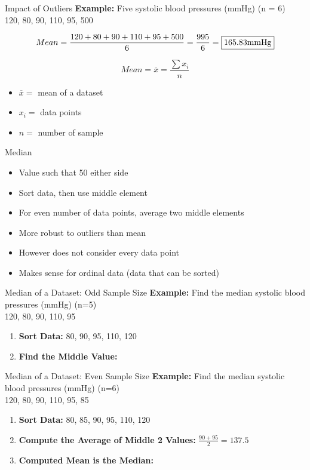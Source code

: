 \begin{frame}[t]{Impact of Outliers}
	\textbf{Example:} Five systolic blood pressures (mmHg) (n = 6) \\ 
	120, 80, 90, 110, 95, 500
	
	$$
	Mean = 
	\frac{120+80+90+110+95+500}{6}
	= \frac{995}{6}
	= \fbox{165.83mmHg}
	$$
	
	$$
	Mean = \overline{x}  = \frac{\sum x_i }{n}
	$$
	
	\begin{itemize}
		\item $	\overline{x} = $ mean of a dataset
		\item $	x_i =$ data points 
		\item $	n =$ number of sample 
	\end{itemize}
\end{frame}



\begin{frame}[t]{Median}
	\begin{itemize}
		\item Value such that 50%
		either side
		\item Sort data, then use middle element
		\item For even number of data points,
		average two middle elements
		\item More robust to outliers than mean
		\item However does not consider every
		data point
		\item Makes sense for ordinal data (data
		that can be sorted)
	\end{itemize}
\end{frame}

\begin{frame}[t]{Median of a Dataset: Odd Sample Size}
	\textbf{Example:} Find the median systolic blood pressures (mmHg) (n=5) \\ 
	120, 80, 90, 110, 95 \pause 
	\begin{enumerate}
		\item \textbf{Sort Data:}  80, 90, 95, 110, 120  \pause 
		\item \textbf{Find the Middle Value:}  
	\end{enumerate}
\end{frame}


\begin{frame}[t]{Median of a Dataset: Even Sample Size}
	\textbf{Example:} Find the median systolic blood pressures (mmHg) (n=6) \\ 
	120, 80, 90, 110, 95, 85 \pause 
	\begin{enumerate}
		\item \textbf{Sort Data:}  80, 85, 90, 95, 110, 120  \pause 
		\item \textbf{Compute the Average of Middle 2 Values:}  
		$\frac{90+95}{2} = 137.5 $ \pause 
		\item \textbf{Computed Mean is the Median:}  
	\end{enumerate}
\end{frame}


